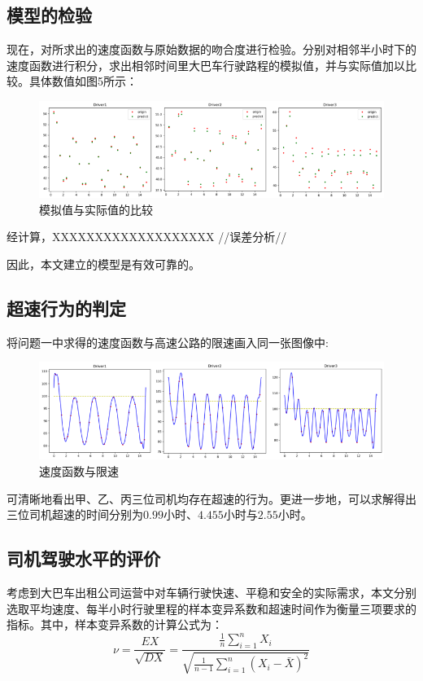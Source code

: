 \documentclass[bwprint]{cumcmthesis}
\begin{document}
        \subsection{模型的检验}
            现在，对所求出的速度函数与原始数据的吻合度进行检验。分别对相邻半小时下的速度函数进行积分，求出相邻时间里大巴车行驶路程的模拟值，并与实际值加以比较。具体数值如图5所示：
            \begin{figure}[htbp]
                \centering
    
                \includegraphics[width=1\linewidth]{compare.png}
                \caption{模拟值与实际值的比较}
            \end{figure}

            经计算，XXXXXXXXXXXXXXXXXXX  //误差分析// 
        
            因此，本文建立的模型是有效可靠的。
        
        \subsection{超速行为的判定}
        将问题一中求得的速度函数与高速公路的限速画入同一张图像中:
        \begin{figure}[htbp]
            \centering

            \includegraphics[width=1\linewidth]{v100.png}
            \caption{速度函数与限速}
        \end{figure}

        可清晰地看出甲、乙、丙三位司机均存在超速的行为。更进一步地，可以求解得出三位司机超速的时间分别为$0.99$小时、$4.455$小时与$2.55$小时。

        \subsection{司机驾驶水平的评价}
        考虑到大巴车出租公司运营中对车辆行驶快速、平稳和安全的实际需求，本文分别选取平均速度、每半小时行驶里程的样本变异系数和超速时间作为衡量三项要求的指标。其中，样本变异系数的计算公式为：
        \begin{equation*}
            \nu = \frac{EX}{\sqrt{DX}} = \frac{\frac{1}{n}\sum_{i=1}^{n}X_i}{\sqrt{\frac{1}{n-1}\sum_{i=1}^{n}\left(X_i-\bar{X}\right)^2}}
        \end{equation*}
\end{document}
